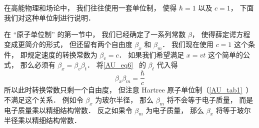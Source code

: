 
\begin{issues}
\issueDraft
\end{issues}


在高能物理和场论中， 我们往往使用一套单位制， 使得 $\hbar = 1$ 以及 $c = 1$， 下面我们对这种单位制进行说明．

在 “原子单位制” 的第一节中， 我们已经确定了一系列常数 $\beta$， 使得薛定谔方程变成更简介的形式， 但还留有两个自由度 $\beta_x$ 和 $\beta_m$． 我们现在使用 $c = 1$ 这个条件， 即规定速度的转换常数为 $\beta_v = c$． 如果我们希望满足 $x = vt$ 这个简单的公式， 那么必须有 $\beta_x = \beta_v \beta _t$． 将\autoref{AU_eq6}~ 的 $\beta_t$ 代入得
\begin{equation}
\beta_x \beta_m = \frac{\hbar}{c}
\end{equation}
所以此时转换常数只剩一个自由度， 但注意 Hartree 原子单位制（\autoref{AU_tab1}~）不满足这个关系． 例如令 $\beta_x$ 为玻尔半径， 那么 $\beta_m$ 将不会等于电子质量， 而是电子质量乘以精细结构常数． 反之如果令 $\beta_m$ 为电子质量， 那么 $\beta_x$ 将等于玻尔半径乘以精细结构常数．
